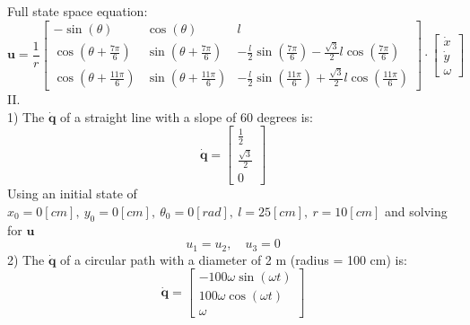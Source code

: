 \documentclass{article}
\begin{document}
\[\]
\newpage
Full state space equation:
\[
\bm{\mathbf{u}} = \frac{1}{r}\begin{bmatrix}
     -\sin(\theta) & \cos(\theta) & l \\  \cos(\theta + \frac{7\pi}{6}) & \sin(\theta + \frac{7\pi}{6}) & -\frac{l}{2}\sin(\frac{7\pi}{6}) - \frac{\sqrt{3}}{2}l\cos(\frac{7\pi}{6}) \\  \cos(\theta + \frac{11\pi}{6}) & \sin(\theta + \frac{11\pi}{6}) & -\frac{l}{2}\sin(\frac{11\pi}{6}) + \frac{\sqrt{3}}{2}l\cos(\frac{11\pi}{6})
\end{bmatrix} \cdot \begin{bmatrix}
    \dot{x} \\ \dot{y} \\ \omega
\end{bmatrix}
\]
II.
\[\]
1) The \(\bm{\mathbf{\dot{q}}}\) of a straight line with a slope of 60 degrees is:
\[
\renewcommand{\arraystretch}{1.3}
\bm{\mathbf{\dot{q}}} = \begin{bmatrix}
    \frac{1}{2} \\ \frac{\sqrt{3}}{2} \\ 0
\end{bmatrix}
\]
Using an initial state of \(x_0 = 0 [cm], \ y_0 = 0 [cm], \ \theta_0 = 0 [rad], \ l = 25 [cm], \ r = 10 [cm]\) and solving for \(\bm{\mathbf{u}}\)
\[
u_1 = u_2, \quad u_3 = 0
\]
2) The \(\bm{\mathbf{\dot{q}}}\) of a circular path with a diameter of 2 m (radius = 100 cm) is:
\[
\renewcommand{\arraystretch}{1.3}
\bm{\mathbf{\dot{q}}} = \begin{bmatrix}
    -100\omega \sin(\omega t) \\ 100\omega \cos(\omega t) \\ \omega
\end{bmatrix}
\]
\end{document}
